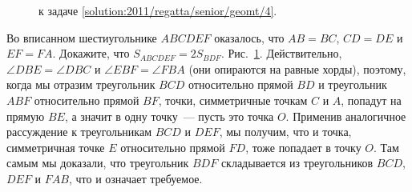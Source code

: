 \ifsolution
\begin{figure}\centering
    \caption{к задаче \ref{solution:2011/regatta/senior/geomt/4}.}
    \label{fig:solution:2011/regatta/senior/geomt/4}
\end{figure}
\fi %

\problem
Во вписанном шестиугольнике $ABCDEF$ оказалось, что
$AB = BC$, $CD = DE$ и $EF = FA$.
Докажите, что $S_{ABCDEF} = 2 S_{BDF}$.
\solution
\label{solution:2011/regatta/senior/geomt/4}%
Рис.~\ref{fig:solution:2011/regatta/senior/geomt/4}.
Действительно, $\angle DBE = \angle DBC$ и $\angle EBF = \angle FBA$
(они опираются на равные хорды),
поэтому, когда мы отразим треугольник $BCD$ относительно прямой $BD$ и
треугольник $ABF$ относительно прямой $BF$, точки, симметричные точкам $C$ и
$A$, попадут на прямую $BE$, а значит в одну точку~--- пусть это точка $O$.
Применив аналогичное рассуждение к треугольникам $BCD$ и $DEF$, мы получим, что
и точка, симметричная точке $E$ относительно прямой $FD$, тоже попадает в точку
$O$.
Там самым мы доказали, что треугольник $BDF$ складывается из треугольников
$BCD$, $DEF$ и $FAB$, что и означает требуемое.
\endproblem
